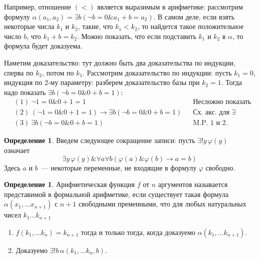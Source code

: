 \documentclass[a4paper,11pt]{article}
\theoremstyle{definition}
\newtheorem{dfn}[thm]{Определение}
\newcommand{\amp}{\mathbin{\&}}
\begin{document}
Например, отношение $(<)$ является выразимым в арифметике: рассмотрим формулу
$\alpha(a_1, a_2) = \exists b(\neg b = 0 \amp a_1 + b = a_2)$. В самом деле, если
взять некоторые числа $k_1$ и $k_2$, такие, что $k_1 < k_2$, то найдется такое
положительное число $b$, что $k_1 + b = k_2$. Можно показать, что если
подставить $k_1$ и $k_2$ в $\alpha$, то формула будет доказуема.

Наметим доказательство: тут должно быть два доказательства по индукции, сперва
по $k_2$, потом по $k_1$. Рассмотрим доказательство по индукции: пусть $k_1 =
0$, индукция по 2-му параметру: разберем доказательство базы при $k_2 = 1$.
Тогда надо показать $\exists b(\neg b = 0 \amp 0 + b = 1)$:
\begin{align*}
&(1)\ \neg 1 = 0 \amp 0 + 1 = 1 &&\text{Несложно показать}\\
&(2)\ (\neg 1 = 0 \amp 0 + 1 = 1) \to \exists b(\neg b = 0 \amp 0 + b = 1) &&\text{Сх. акс. для } \exists\\
&(3)\ \exists b(\neg b = 0 \amp 0 + b = 1) &&\text{M.P. 1 и 2.}
\end{align*}

\begin{dfn}
Введем следующее сокращение записи: пусть $\exists!y\,\varphi(y)$ означает
\[ \exists y\,\varphi(y) \amp \forall a\forall b(\varphi(a) \amp \varphi(b) \to a = b) \]
Здесь $a$ и $b$~--- некоторые переменные, не входящие в формулу $\varphi$
свободно.
\end{dfn}

\begin{dfn}
Арифметическая функция $f$ от $n$ аргументов называется представимой в
формальной арифметике, если существует такая формула $\alpha(x_1, \dots
x_{n+1})$ с $n+1$ свободными пременными, что для любых натуральных чисел $k_1
\dots k_{n+1}$
\begin{enumerate}
\item $f(k_1, \dots k_n) = k_{n+1}$ тогда и только тогда, когда доказуемо
  $\alpha(k_1, \dots k_{n+1})$.
\item Доказуемо $\exists!b\,\alpha(k_1, \dots k_n, b)$.
\end{enumerate}
\end{dfn}
\end{document}

